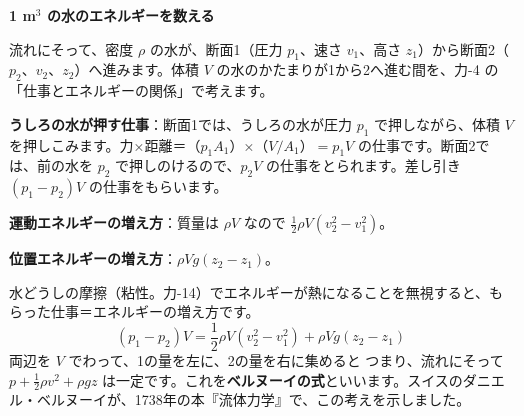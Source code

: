 \noindent\textbf{1 m$^3$ の水のエネルギーを数える}\par\nobreak
流れにそって、密度 $\rho$ の水が、断面1（圧力 $p_1$、速さ $v_1$、高さ $z_1$）から断面2（$p_2$、$v_2$、$z_2$）へ進みます。体積 $V$ の水のかたまりが1から2へ進む間を、力-4 の「仕事とエネルギーの関係」で考えます。
\begin{enumerate}[label={\bkcircled[bkBlue]{\arabic*}}, leftmargin=2.4\zw, itemsep=2pt, topsep=2pt]
\item \textbf{うしろの水が押す仕事}：断面1では、うしろの水が圧力 $p_1$ で押しながら、体積 $V$ を押しこみます。力×距離＝（$p_1A_1$）×（$V/A_1$）$=p_1V$ の仕事です。断面2では、前の水を $p_2$ で押しのけるので、$p_2V$ の仕事をとられます。差し引き $(p_1-p_2)V$ の仕事をもらいます。
\item \textbf{運動エネルギーの増え方}：質量は $\rho V$ なので $\tfrac{1}{2}\rho V(v_2^2-v_1^2)$。
\item \textbf{位置エネルギーの増え方}：$\rho Vg(z_2-z_1)$。
\end{enumerate}
水どうしの摩擦（粘性。力-14）でエネルギーが熱になることを無視すると、もらった仕事＝エネルギーの増え方です。
\[ (p_1-p_2)V=\frac{1}{2}\rho V(v_2^2-v_1^2)+\rho Vg(z_2-z_1) \]
両辺を $V$ でわって、1の量を左に、2の量を右に集めると
\label{ph:力-13:bernoulli}つまり、流れにそって $p+\tfrac{1}{2}\rho v^2+\rho gz$ は一定です。これを\textbf{ベルヌーイの式}といいます。スイスのダニエル・ベルヌーイが、1738年の本『流体力学』で、この考えを示しました。

